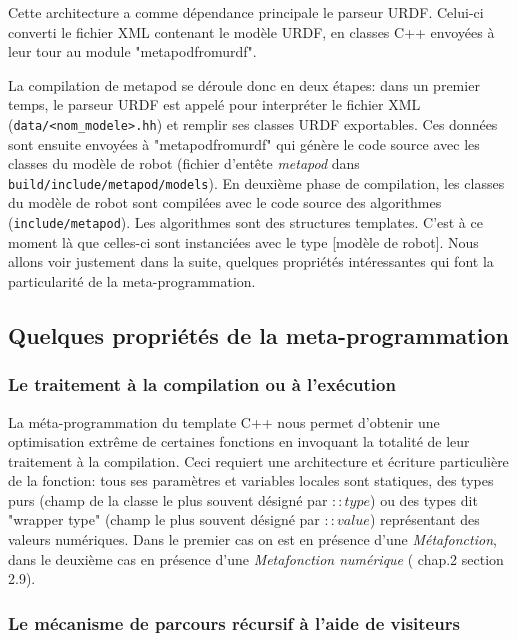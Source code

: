 \documentclass{report}
\begin{document}
Cette architecture a comme dépendance principale le parseur URDF. Celui-ci converti le fichier XML contenant le modèle URDF, en classes C++ envoyées à leur tour au module "metapodfromurdf".

La compilation de metapod se déroule donc en deux étapes: dans un premier temps, le parseur URDF est appelé pour interpréter le fichier XML (\verb;data/<nom_modele>.hh;) et remplir ses classes URDF exportables. Ces données sont ensuite envoyées à "metapodfromurdf" qui génère le code source avec les classes du modèle de robot (fichier d'entête \emph{metapod} dans \verb;build/include/metapod/models;). En deuxième phase de compilation, les classes du modèle de robot sont compilées avec le code source des algorithmes (\verb;include/metapod;). Les algorithmes sont des structures templates. C'est à ce moment là que celles-ci sont instanciées avec le type [modèle de robot]. Nous allons voir justement dans la suite, quelques propriétés intéressantes qui font la particularité de la meta-programmation.

\subsection{Quelques propriétés de la meta-programmation}

\subsubsection*{Le traitement à la compilation ou à l'exécution}

La méta-programmation du template C++ nous permet d'obtenir une optimisation extrême de certaines fonctions en invoquant la totalité de leur traitement à la compilation. Ceci requiert une architecture et écriture particulière de la fonction: tous ses paramètres et variables locales sont statiques, des types purs (champ de la classe le plus souvent désigné par $::type$) ou des types dit "wrapper type" (champ le plus souvent désigné par $::value$) représentant des valeurs numériques. Dans le premier cas on est en présence d'une \emph{Métafonction}, dans le deuxième cas en présence d'une \emph{Metafonction numérique} (\cite{bib_metaprogramming} chap.2 section 2.9).

\subsubsection*{Le mécanisme de parcours récursif à l'aide de visiteurs} \label{ch_concepts_visiteurs}
\end{document}
